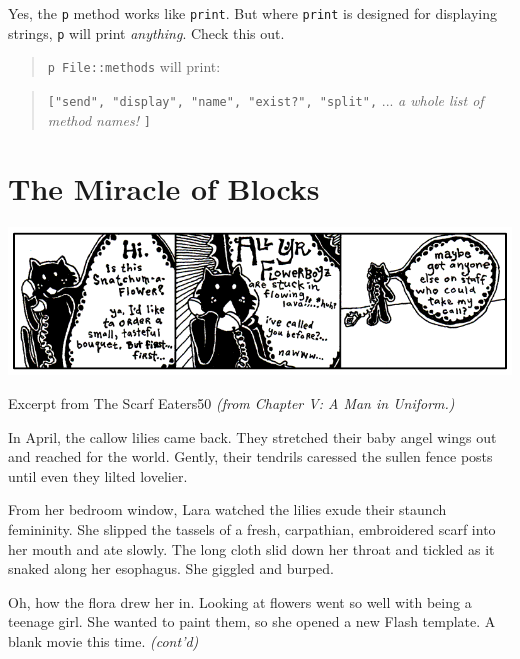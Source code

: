 \documentclass[10pt,twoside]{report}
\begin{document}
Yes, the \lstinline[breaklines=true]|p| method works like
\lstinline[breaklines=true]|print|.  But where
\lstinline[breaklines=true]|print| is designed for displaying strings,
\lstinline[breaklines=true]|p| will print {\em anything}.  Check this
out.

\begin{quote}
\lstinline[breaklines=true]|p File::methods| will print:\end{quote}


\begin{quote}
\lstinline[breaklines=true]|["send", "display", "name", "exist?", "split",|
 ... {\em a whole list of method names!}
  \lstinline[breaklines=true]|]|\end{quote}



\section{The Miracle of Blocks}


	\includegraphics[width=1.0\textwidth]{cache/30.png}

	\begin{sidebar}{Excerpt from The Scarf Eaters}{50}
		\textit{(from Chapter V: A Man in Uniform.)}\vspace{6pt}
		
		In April, the callow lilies came back. They stretched their baby angel wings out and reached for the world. Gently, their tendrils caressed the sullen fence posts until even they lilted lovelier.\vspace{6pt}

		From her bedroom window, Lara watched the lilies exude their staunch femininity. She slipped the tassels of a fresh, carpathian, embroidered scarf into her mouth and ate slowly. The long cloth slid down her throat and tickled as it snaked along her esophagus. She giggled and burped.\vspace{6pt}

		Oh, how the flora drew her in. Looking at flowers went so well with being a teenage girl. She wanted to paint them, so she opened a new Flash template. A blank movie this time. \textit{(cont'd)}
	\end{sidebar}
\end{document}
